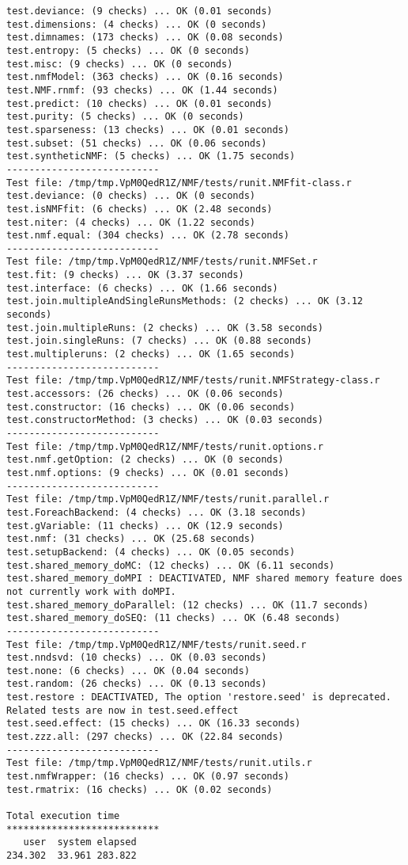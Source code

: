 \documentclass[10pt]{article}
\begin{document}
\begin{verbatim}
test.deviance: (9 checks) ... OK (0.01 seconds)
test.dimensions: (4 checks) ... OK (0 seconds)
test.dimnames: (173 checks) ... OK (0.08 seconds)
test.entropy: (5 checks) ... OK (0 seconds)
test.misc: (9 checks) ... OK (0 seconds)
test.nmfModel: (363 checks) ... OK (0.16 seconds)
test.NMF.rnmf: (93 checks) ... OK (1.44 seconds)
test.predict: (10 checks) ... OK (0.01 seconds)
test.purity: (5 checks) ... OK (0 seconds)
test.sparseness: (13 checks) ... OK (0.01 seconds)
test.subset: (51 checks) ... OK (0.06 seconds)
test.syntheticNMF: (5 checks) ... OK (1.75 seconds)
--------------------------- 
Test file: /tmp/tmp.VpM0QedR1Z/NMF/tests/runit.NMFfit-class.r 
test.deviance: (0 checks) ... OK (0 seconds)
test.isNMFfit: (6 checks) ... OK (2.48 seconds)
test.niter: (4 checks) ... OK (1.22 seconds)
test.nmf.equal: (304 checks) ... OK (2.78 seconds)
--------------------------- 
Test file: /tmp/tmp.VpM0QedR1Z/NMF/tests/runit.NMFSet.r 
test.fit: (9 checks) ... OK (3.37 seconds)
test.interface: (6 checks) ... OK (1.66 seconds)
test.join.multipleAndSingleRunsMethods: (2 checks) ... OK (3.12 seconds)
test.join.multipleRuns: (2 checks) ... OK (3.58 seconds)
test.join.singleRuns: (7 checks) ... OK (0.88 seconds)
test.multipleruns: (2 checks) ... OK (1.65 seconds)
--------------------------- 
Test file: /tmp/tmp.VpM0QedR1Z/NMF/tests/runit.NMFStrategy-class.r 
test.accessors: (26 checks) ... OK (0.06 seconds)
test.constructor: (16 checks) ... OK (0.06 seconds)
test.constructorMethod: (3 checks) ... OK (0.03 seconds)
--------------------------- 
Test file: /tmp/tmp.VpM0QedR1Z/NMF/tests/runit.options.r 
test.nmf.getOption: (2 checks) ... OK (0 seconds)
test.nmf.options: (9 checks) ... OK (0.01 seconds)
--------------------------- 
Test file: /tmp/tmp.VpM0QedR1Z/NMF/tests/runit.parallel.r 
test.ForeachBackend: (4 checks) ... OK (3.18 seconds)
test.gVariable: (11 checks) ... OK (12.9 seconds)
test.nmf: (31 checks) ... OK (25.68 seconds)
test.setupBackend: (4 checks) ... OK (0.05 seconds)
test.shared_memory_doMC: (12 checks) ... OK (6.11 seconds)
test.shared_memory_doMPI : DEACTIVATED, NMF shared memory feature does not currently work with doMPI.
test.shared_memory_doParallel: (12 checks) ... OK (11.7 seconds)
test.shared_memory_doSEQ: (11 checks) ... OK (6.48 seconds)
--------------------------- 
Test file: /tmp/tmp.VpM0QedR1Z/NMF/tests/runit.seed.r 
test.nndsvd: (10 checks) ... OK (0.03 seconds)
test.none: (6 checks) ... OK (0.04 seconds)
test.random: (26 checks) ... OK (0.13 seconds)
test.restore : DEACTIVATED, The option 'restore.seed' is deprecated. Related tests are now in test.seed.effect
test.seed.effect: (15 checks) ... OK (16.33 seconds)
test.zzz.all: (297 checks) ... OK (22.84 seconds)
--------------------------- 
Test file: /tmp/tmp.VpM0QedR1Z/NMF/tests/runit.utils.r 
test.nmfWrapper: (16 checks) ... OK (0.97 seconds)
test.rmatrix: (16 checks) ... OK (0.02 seconds)

Total execution time
***************************
   user  system elapsed 
234.302  33.961 283.822 

\end{verbatim}
\end{document}
